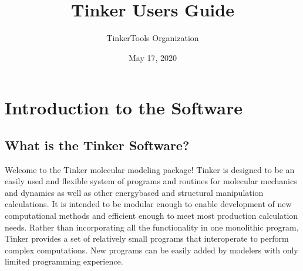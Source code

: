 \documentclass[letterpaper,11pt,english]{sphinxmanual}
\title{Tinker User\textquotesingle{}s Guide}
\date{May 17, 2020}
\author{TinkerTools Organization}
\begin{document}
\pagestyle{empty}
\sphinxmaketitle
\pagestyle{plain}
\sphinxtableofcontents
\pagestyle{normal}
\label{\detokenize{index::doc}}



\chapter{Introduction to the Software}
\label{\detokenize{text/introduction:introduction-to-the-software}}\label{\detokenize{text/introduction::doc}}

\section{What is the Tinker Software?}
\label{\detokenize{text/introduction:what-is-the-tinker-software}}
Welcome to the Tinker molecular modeling package! Tinker is designed to be an easily used and flexible system of programs and routines for molecular mechanics and dynamics as well as other energy\sphinxhyphen{}based and structural manipulation calculations. It is intended to be modular enough to enable development of new computational methods and efficient enough to meet most production calculation needs. Rather than incorporating all the functionality in one monolithic program, Tinker provides a set of relatively small programs that interoperate to perform complex computations. New programs can be easily added by modelers with only limited programming experience.
\end{document}
